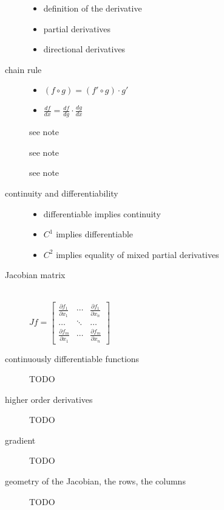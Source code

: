 \begin{description}
\item[]\hfill
	\begin{itemize}
		\item definition of the derivative
		\item partial derivatives
		\item directional derivatives
	\end{itemize}
\item[chain rule]\hfill
	\begin{itemize}
	\item$(f\circ g) = (f' \circ g)\cdot g'$
	\item$\frac{d f}{d x} = \frac{d f}{d g}\cdot \frac{d g}{d x}$
	\end{itemize}
\item[] see note
\item[] see note
\item[] see note
\item[continuity and differentiability]\hfill
	\begin{itemize}
	\item differentiable implies continuity
	\item $C^1$ implies differentiable
	\item $C^2$ implies equality of mixed partial derivatives
	\end{itemize}
\item[Jacobian matrix]\hfill\\
	$
	Jf = \begin{bmatrix}
	  \frac{\partial f_1}{\partial x_1} & \cdots & \frac{\partial f_1}{\partial x_n}\\
	  \ldots & \ddots & \ldots \\
	  \frac{\partial f_m}{\partial x_1} & \cdots & \frac{\partial f_m}{\partial x_n}
	 \end{bmatrix}
	$
\item[continuously differentiable functions]TODO
\item[higher order derivatives]TODO
\item[gradient]TODO
\item[geometry of the Jacobian, the rows, the columns]TODO
\end{description}


